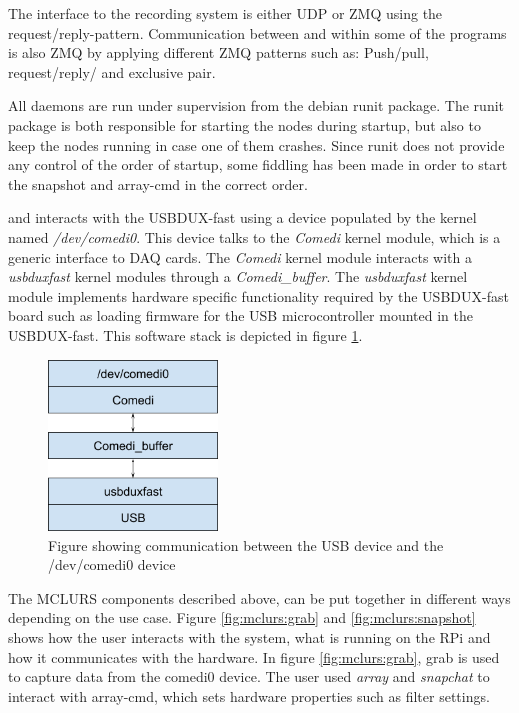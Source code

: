 
The interface to the recording system is either UDP or ZMQ using the request/reply-pattern. Communication  between and within some of the programs is also ZMQ by applying different ZMQ patterns such as: Push/pull, request/reply/ and exclusive pair.

All daemons are run under supervision from the debian runit package. The runit package is both responsible for starting the nodes during startup, but also to keep the nodes running in case one of them crashes. Since runit does not provide any control of the order of startup, some fiddling has been made in order to start the snapshot and array-cmd in the correct order.


 \label{sec:existingsystem:software:kernelmodule}
 and  interacts with the USBDUX-fast using a device populated by the kernel named \textit{/dev/comedi0}.
This device talks to the \textit{Comedi} kernel module, which is a generic interface to \ac{DAQ} cards. The  \textit{Comedi} kernel module interacts with a \textit{usbduxfast} kernel modules through a \textit{Comedi\_buffer}.
The \textit{usbduxfast} kernel module implements hardware specific functionality required by the USBDUX-fast board such as loading firmware for the USB microcontroller mounted in the USBDUX-fast.
This software stack is depicted in figure \ref{fig:existingsystem:kernel}.

\begin{figure}[H]
	\centering
	\includegraphics[width=0.4\textwidth]{figures/mclurs_comedi}
	\caption{Figure showing communication between the USB device and the /dev/comedi0 device}
	\label{fig:existingsystem:kernel}
\end{figure}

 \label{sc:existingsystem:setup}
The MCLURS components described above, can be put together in different ways depending on the use case. Figure \ref{fig:mclurs:grab} and \ref{fig:mclurs:snapshot} shows how the user interacts with the system, what is running on the \ac{RPi} and how it communicates with the hardware. In figure \ref{fig:mclurs:grab}, grab is used to capture data from the comedi0 device. The user used \textit{array} and \textit{snapchat} to interact with array-cmd, which sets hardware properties such as filter settings.

